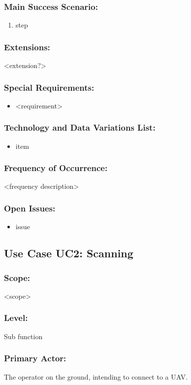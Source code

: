 \documentclass[ProductRequirements.tex]{subfiles}
\begin{document}
	\subsubsection*{Main Success Scenario:}
	\begin{enumerate}\itemsep1pt
		\item step
	\end{enumerate}
	\subsubsection*{Extensions:}
	<extension?>
	\subsubsection*{Special Requirements:}
	\begin{itemize}\itemsep1pt
		\item <requirement>
	\end{itemize}
	\subsubsection*{Technology and Data Variations List:}
	\begin{itemize}\itemsep1pt
		\item item
	\end{itemize}
	\subsubsection*{Frequency of Occurrence:}
	<frequency description>
	\subsubsection*{Open Issues:}
	\begin{itemize}\itemsep1pt
		\item issue
	\end{itemize}
	
	
	\subsection{Use Case UC2: Scanning}
	\subsubsection*{Scope:}
	<scope>
	\subsubsection*{Level:}
	Sub function
	\subsubsection*{Primary Actor:}
	The operator on the ground, intending to connect to a UAV.
\end{document}
